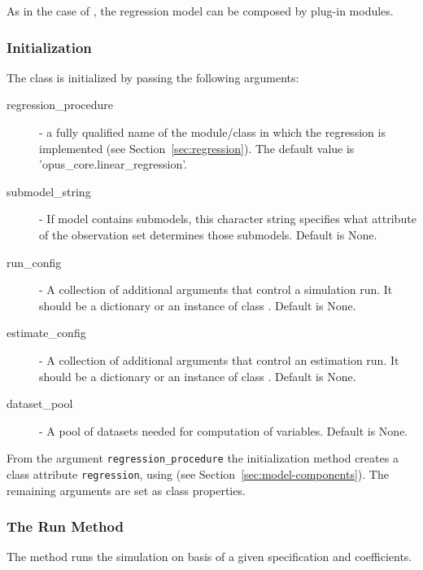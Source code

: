 As in the case of , the regression model can be composed by
plug-in modules.

\subsubsection{Initialization}
The class is initialized by passing the following arguments:
\begin{description}
\item[regression_procedure] - a fully qualified name of the module/class in
  which the regression is implemented (see Section~\ref{sec:regression}).
  The default value is 'opus_core.linear_regression'.
\item[submodel_string] - If model contains submodels, this character string
  specifies what attribute of the observation set determines those submodels. Default is None.
\item[run_config] - A collection of additional arguments that control a
  simulation run. It should be a dictionary or an instance of class . Default is None.
\item[estimate_config] - A collection of additional arguments that control an
  estimation run. It should be a dictionary or an instance of class . Default is None.
\item[dataset_pool] - A pool of datasets needed for computation of variables. Default is None.
\end{description}
From the argument \verb|regression_procedure| the initialization method
creates a class attribute \verb|regression|, using
 (see Section~\ref{sec:model-components}).
The remaining arguments are set as class properties.

\subsubsection{The Run Method}
%
The  method runs the simulation on basis of a given
specification and coefficients.

